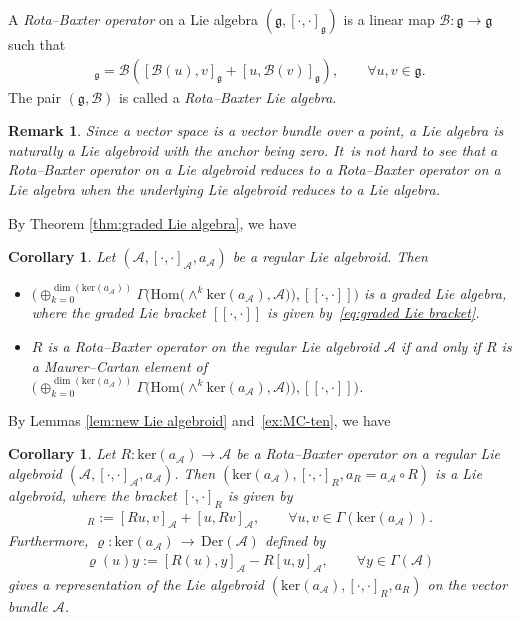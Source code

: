\documentclass[pdftex]{sigma}%
\numberwithin{equation}{section}
\newtheorem{cor}[thm]{Corollary}
\newtheorem{rmk}[thm]{Remark}
\newcommand{\g}{\mathfrak g}
\newcommand{\huaA}{\mathcal{A}}
\newcommand{\huaB}{\mathcal{B}}
\newcommand{\Courant}[1]{\left[\!\left[ #1\right]\!\right]}
\newcommand{\lon }{\,\rightarrow\,}
\newcommand{\Hom}{\mathrm{Hom}}
\newcommand{\Der}{\mathrm{Der}}
\newcommand{\Ker}{\mathrm{ker}}
\begin{document}
A {\it Rota--Baxter operator} on a Lie algebra $(\g,[\cdot,\cdot]_\g)$ is a linear map $\huaB\colon \g\to \g$ such that
\begin{gather*}
 [\huaB(u),\huaB(v)]_\g=\huaB([\huaB(u),v]_\g+[u,\huaB(v)]_\g),\qquad \forall u,v\in\g.
 \end{gather*}
The pair $(\g,\huaB)$ is called a {\it Rota--Baxter Lie algebra}.
\begin{rmk}
Since a vector space is a vector bundle over a point, a Lie algebra is naturally
a Lie algebroid with the anchor being zero. It~is not hard to see that a Rota--Baxter operator on a Lie algebroid reduces
to a Rota--Baxter operator on a Lie algebra when the underlying Lie algebroid reduces to a Lie algebra.
\end{rmk}



By Theorem \ref{thm:graded Lie algebra}, we have
\begin{cor}
Let $(\huaA,[\cdot,\cdot]_\huaA,a_\huaA)$ be a regular Lie algebroid. Then
\begin{itemize}\itemsep=0pt
 \item[$(i)$] $\bigl(\oplus_{k=0}^{\dim (\Ker(a_\huaA))} \Gamma\big(\Hom\big({\wedge}^{k}\Ker(a_\huaA),\huaA\big)\big),\Courant{\cdot,\cdot}\bigr)$ is a graded Lie algebra, where the graded Lie bracket $\Courant{\cdot,\cdot}$ is given by~\eqref{eq:graded Lie bracket}.
 \item[$(ii)$] $R$ is a Rota--Baxter operator on the regular Lie algebroid $\huaA$ if and only if $R$ is a Maurer--Cartan element of $\bigl(\oplus_{k=0}^{\dim (\Ker(a_\huaA))}\Gamma\big(\Hom\big({\wedge}^{k}\Ker(a_\huaA),\huaA\big)\big),\Courant{\cdot,\cdot}\bigr)$.
\end{itemize}
\end{cor}

By Lemmas \ref{lem:new Lie algebroid} and~\ref{ex:MC-ten}, we have

\begin{cor}
 Let $R\colon \Ker(a_\huaA)\longrightarrow \huaA$ be a Rota--Baxter operator on a regular Lie algebroid $(\huaA,[\cdot,\cdot]_\huaA,a_\huaA)$. Then $(\Ker(a_\huaA),[\cdot,\cdot]_R,a_R=a_\huaA\circ R)$ is a Lie algebroid, where the bracket $[\cdot,\cdot]_R$ is given by
\begin{gather*}
[u,v]_R:=[Ru,v]_\huaA+[u,Rv]_\huaA,\qquad \forall u,v\in\Gamma(\Ker(a_\huaA)).
\end{gather*}
 Furthermore, $ \mathbf{\varrho}\colon \Ker(a_\huaA)\lon\Der(\huaA)$ defined by
 \begin{gather*}
 \varrho(u)y:=[R(u),y]_\huaA-R[u,y]_\huaA, \qquad \forall y\in\Gamma(\huaA)
 \end{gather*}
 gives a representation of the Lie algebroid $(\Ker(a_\huaA),[\cdot,\cdot]_R,a_R)$ on the vector bundle $\huaA$.
\end{cor}
\end{document}
